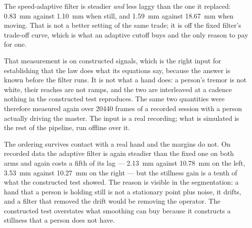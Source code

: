 The speed-adaptive filter is steadier \emph{and} less laggy than the one it
replaced: \SI{0.83}{\milli\metre} against \SI{1.10}{\milli\metre} when still,
and \SI{1.59}{\milli\metre} against \SI{18.67}{\milli\metre} when moving.
That is not a better setting of the same trade; it is off the fixed filter's
trade-off curve, which is what an adaptive cutoff buys and the only reason to
pay for one.

That measurement is on constructed signals, which is the right input for
establishing that the law does what its equations say, because the answer is
known before the filter runs. It is not what a hand does: a person's tremor
is not white, their reaches are not ramps, and the two are interleaved at a
cadence nothing in the constructed test reproduces. The same two quantities
were therefore measured again over \num{20440} frames of a recorded session
with a person actually driving the master. The input is a real recording;
what is simulated is the rest of the pipeline, run offline over it.

\begin{table}[htbp]
  \centering
  \small
  \caption[The smoother over a recorded session]{The same two quantities on a
  real operator's hand: \num{20440} recorded frames per arm over
  \SI{755}{\second}. Still and moving segments are found once, from the
  \emph{raw} commanded position, and the same segmentation is applied to
  every filter --- deriving it from each filter's own output would let a
  heavier filter classify more of the recording as still, which is the
  quantity being measured, and every filter would then score well on its own
  definition.}
  \label{tab:sim-replay}
  
\end{table}

The ordering survives contact with a real hand and the margins do not. On
recorded data the adaptive filter is again steadier than the fixed one on
both arms and again costs a fifth of its lag --- \SI{2.13}{\milli\metre}
against \SI{10.78}{\milli\metre} on the left, \SI{3.53}{\milli\metre} against
\SI{10.27}{\milli\metre} on the right --- but the stillness gain is a tenth
of what the constructed test showed. The reason is visible in the
segmentation: a hand that a person is holding still is not a stationary point
plus noise, it drifts, and a filter that removed the drift would be removing
the operator. The constructed test overstates what smoothing can buy because
it constructs a stillness that a person does not have.

